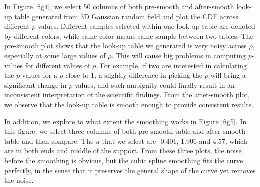 \documentclass{article}
\begin{document}
In Figure \ref{fig4}, we select 50 columns of both pre-smooth and after-smooth look-up table generated from 3D Gaussian random field and plot the CDF across different $\rho$ values. Different samples selected within one look-up table are denoted by different colors, while same color means same sample between two tables. The pre-smooth plot shows that the look-up table we generated is very noisy across $\rho$, especially at some large values of $\rho$. This will cause big problems in computing $p$-values for different values of $\rho$. For example, if two are interested in calculating the $p$-values for a $\rho$ close to 1, a slightly difference in picking the $\rho$ will bring a significant change in $p$-values, and such ambiguity could finally result in an inconsistent interpretation of the scientific findings. From the after-smooth plot, we observe that the look-up table is smooth enough to provide consistent results. 

In addition, we explore to what extent the smoothing works in Figure \ref{fig5}. In this figure, we select three columns of both pre-smooth table and after-smooth table and then compare. The $u$ that we select are -0.401, 1.906 and 4.57, which are in both ends and middle of the support. From these three plots, the noise before the smoothing is obvious, but the cubic spline smoothing fits the curve perfectly, in the sense that it preserves the general shape of the curve yet removes the noise.
\end{document}
